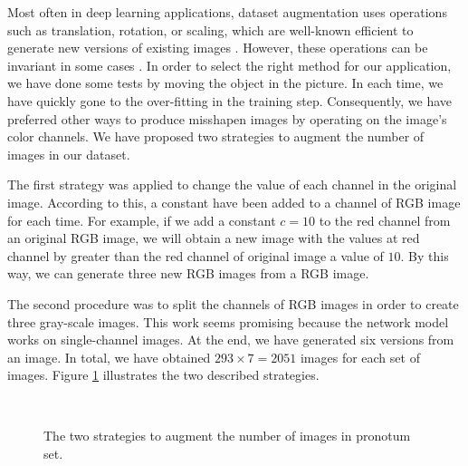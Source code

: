 \documentclass[review]{elsarticle}
\begin{document}
Most often in deep learning applications, dataset augmentation uses operations such as translation, rotation, or scaling, which are well-known efficient to generate new versions of existing images \cite{krizhevsky2012imagenet, shorten2019survey}. However, these operations can be invariant in some cases \cite{shorten2019survey}. In order to select the right method for our application, we have done some tests by moving the object in the picture. In each time, we have quickly gone to the over-fitting in the training step. Consequently, we have preferred other ways to produce misshapen images by operating on the image's color channels. We have proposed two strategies to augment the number of images in our dataset.

The first strategy was applied to change the value of each channel in the original image. According to this, a constant have been added to a channel of RGB image for each time. For example, if we add a constant $c = 10$ to the red channel from an original RGB image, we will obtain a new image with the values at red channel by greater than the red channel of original image a value of $10$. By this way, we can generate three new RGB images from a RGB image.

The second procedure was to split the channels of RGB images in order to create three gray-scale images. This work seems promising because the network model works on single-channel images. At the end, we have generated six versions from an image. In total, we have obtained $293 \times 7 = 2051$ images for each set of images. Figure \ref{figdataauge} illustrates the two described strategies.

\begin{figure}[h!]
    \centering
    ~~
    \caption{The two strategies to augment the number of images in pronotum set.}
    \label{figdataauge}
\end{figure}
\end{document}
